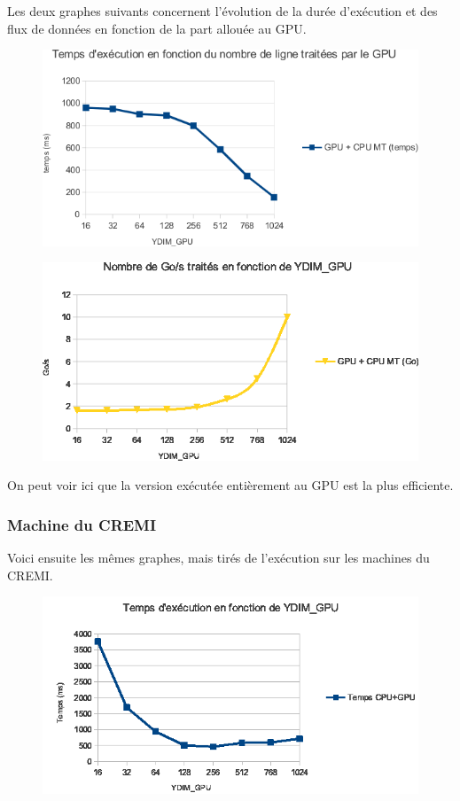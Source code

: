 	Les deux graphes suivants concernent l'évolution de la durée d'exécution et des flux de données en fonction de la part allouée au GPU.
	
		\begin{figure}[H]
			\centering
			\includegraphics[scale=1.0]{temps}
		\end{figure}
	
		\begin{figure}[H]
			\centering
			\includegraphics[scale=1.0]{go}
		\end{figure}

On peut voir ici que la version exécutée entièrement au GPU est la plus efficiente. 		
	\subsubsection{Machine du CREMI}
	
	Voici ensuite les mêmes graphes, mais tirés de l'exécution sur les machines du CREMI.
	
	\begin{figure}[H]
			\centering
			\includegraphics[scale=1.0]{tps_cremi.png}
		\end{figure}
	
